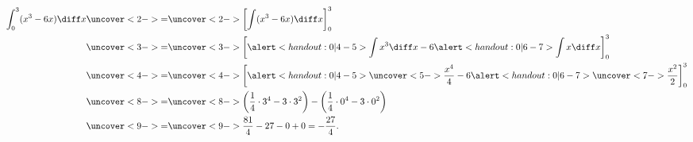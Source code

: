 \begin{frame}
\begin{example}[Example 4, p. 359]
\abovedisplayskip=0pt
\belowdisplayskip=0pt
\abovedisplayshortskip=0pt
\belowdisplayshortskip=0pt
\begin{align*}
\int_0^3 (x^3 - 6x)\diff x %
& \uncover<2->{=}  \uncover<2->{\left[ \int (x^3 - 6x)\diff x  \right]_0^3}\\%
& \uncover<3->{=}  \uncover<3->{\left[ \alert<handout:0| 4-5>{\int x^3 \diff x} - 6\alert<handout:0| 6-7>{\int x \diff x}  \right]_0^3}\\%
& \uncover<4->{=}  \uncover<4->{\left[ \alert<handout:0| 4-5>{\uncover<5->{\frac{x^4}{4}}} - 6\alert<handout:0| 6-7>{\uncover<7->{\frac{x^2}{2}}}  \right]_0^3}\\%
& \uncover<8->{=}  \uncover<8->{ \left( \frac{1}{4} \cdot 3^4 - 3\cdot 3^2 \right) - \left( \frac{1}{4}\cdot 0^4 - 3\cdot 0^2  \right) }\\%
& \uncover<9->{=}  \uncover<9->{ \frac{81}{4} - 27 - 0 + 0 = -\frac{27}{4}.}
\end{align*}
\end{example}
\end{frame}
